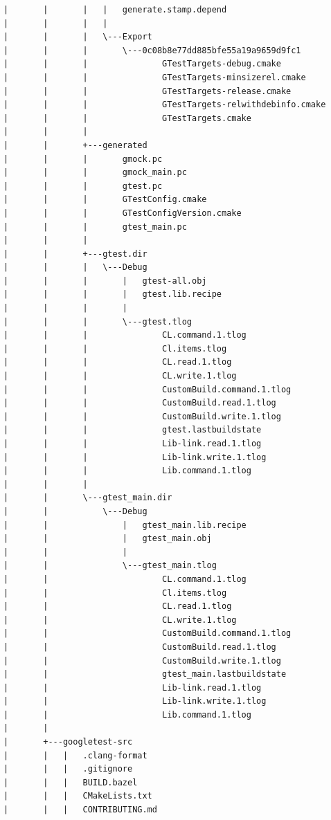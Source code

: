 \documentclass[12pt,a4paper]{article}
\begin{document}
\begin{verbatim}
|       |       |   |   generate.stamp.depend
|       |       |   |   
|       |       |   \---Export
|       |       |       \---0c08b8e77dd885bfe55a19a9659d9fc1
|       |       |               GTestTargets-debug.cmake
|       |       |               GTestTargets-minsizerel.cmake
|       |       |               GTestTargets-release.cmake
|       |       |               GTestTargets-relwithdebinfo.cmake
|       |       |               GTestTargets.cmake
|       |       |               
|       |       +---generated
|       |       |       gmock.pc
|       |       |       gmock_main.pc
|       |       |       gtest.pc
|       |       |       GTestConfig.cmake
|       |       |       GTestConfigVersion.cmake
|       |       |       gtest_main.pc
|       |       |       
|       |       +---gtest.dir
|       |       |   \---Debug
|       |       |       |   gtest-all.obj
|       |       |       |   gtest.lib.recipe
|       |       |       |   
|       |       |       \---gtest.tlog
|       |       |               CL.command.1.tlog
|       |       |               Cl.items.tlog
|       |       |               CL.read.1.tlog
|       |       |               CL.write.1.tlog
|       |       |               CustomBuild.command.1.tlog
|       |       |               CustomBuild.read.1.tlog
|       |       |               CustomBuild.write.1.tlog
|       |       |               gtest.lastbuildstate
|       |       |               Lib-link.read.1.tlog
|       |       |               Lib-link.write.1.tlog
|       |       |               Lib.command.1.tlog
|       |       |               
|       |       \---gtest_main.dir
|       |           \---Debug
|       |               |   gtest_main.lib.recipe
|       |               |   gtest_main.obj
|       |               |   
|       |               \---gtest_main.tlog
|       |                       CL.command.1.tlog
|       |                       Cl.items.tlog
|       |                       CL.read.1.tlog
|       |                       CL.write.1.tlog
|       |                       CustomBuild.command.1.tlog
|       |                       CustomBuild.read.1.tlog
|       |                       CustomBuild.write.1.tlog
|       |                       gtest_main.lastbuildstate
|       |                       Lib-link.read.1.tlog
|       |                       Lib-link.write.1.tlog
|       |                       Lib.command.1.tlog
|       |                       
|       +---googletest-src
|       |   |   .clang-format
|       |   |   .gitignore
|       |   |   BUILD.bazel
|       |   |   CMakeLists.txt
|       |   |   CONTRIBUTING.md

\end{verbatim}
\end{document}
